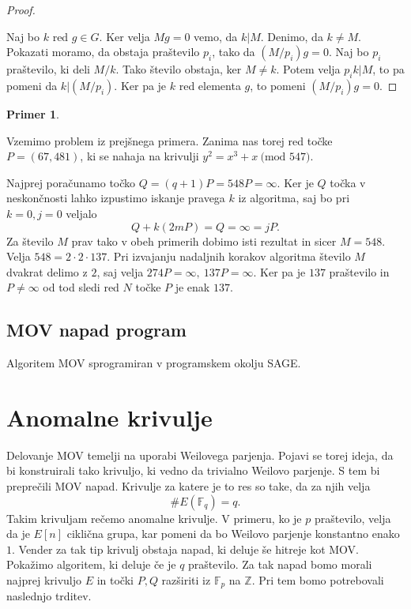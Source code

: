 \documentclass[12pt,a4paper,twoside]{article}
\theoremstyle{definition} %
\newtheorem{primer}[definicija]{Primer}
\theoremstyle{plain} %
\numberwithin{equation}{section}  %
\newcommand{\Z}{\mathbb Z}
\newcommand{\F}{\mathbb F}
\newcommand{\E}[1]{E({#1})}
\newcommand{\MOD}[1]{\ \text{(mod }{#1}\text{)}}
\begin{document}
\begin{proof}~

Naj bo $k$ red $g\in G$. Ker velja $Mg = 0$ vemo, da $k|M$. Denimo, da $k \neq M$. Pokazati moramo, da obstaja praštevilo $p_i$, tako da $(M/p_i)g = 0$. Naj bo $p_i$ praštevilo, ki deli $M/k$. Tako število obstaja, ker $M \neq k$. Potem velja $p_ik|M$, to pa pomeni da $k|(M/p_i)$. Ker pa je $k$ red elementa $g$, to pomeni $(M/p_i)g = 0$.

\end{proof}


\begin{primer}~

Vzemimo problem iz prejšnega primera. Zanima nas torej red točke \newline $P=(67,481)$, ki se nahaja na krivulji $y^2 = x^3+x \MOD{547}$.

Najprej poračunamo točko $Q = (q+1)P = 548P = \infty$. Ker je $Q$ točka v neskončnosti lahko izpustimo iskanje pravega $k$ iz algoritma, saj bo pri $k=0,j=0$ veljalo
$$Q+k(2mP) = Q =  \infty = jP.$$
Za število $M$ prav tako v obeh primerih dobimo isti rezultat in sicer $M = 548$. Velja $548=2\cdot 2\cdot 137$. Pri izvajanju nadaljnih korakov algoritma število $M$ dvakrat delimo z $2$, saj velja $274P = \infty, \ 137P = \infty$. Ker pa je $137$ praštevilo in $P \neq \infty$ od tod sledi red $N$ točke $P$ je enak $137$.

\end{primer}


\subsection{MOV napad program}

Algoritem MOV sprogramiran v programskem okolju SAGE.



\newpage

\section{Anomalne krivulje}

Delovanje MOV temelji na uporabi Weilovega parjenja. Pojavi se torej ideja, da bi konstruirali tako krivuljo, ki vedno da trivialno Weilovo parjenje. S tem bi preprečili MOV napad. Krivulje za katere je to res so take, da za njih velja
$$\#\E{\F_q} = q.$$
Takim krivuljam rečemo anomalne krivulje. V primeru, ko je $p$ praštevilo, velja da je $E[n]$ ciklična grupa, kar pomeni da bo Weilovo parjenje konstantno enako $1$. Vender za tak tip krivulj obstaja napad, ki deluje še hitreje kot MOV.
Pokažimo algoritem, ki deluje če je $q$ praštevilo.
Za tak napad bomo morali najprej krivuljo $E$ in točki $P,Q$ razširiti iz $\F_p$ na $\Z$. Pri tem bomo potrebovali naslednjo trditev.
\end{document}
